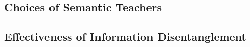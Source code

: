 \subsection{Choices of Semantic Teachers }
\label{sec:semantic_teacher}


\subsection{Effectiveness of Information Disentanglement}
\label{sec:oneshot_vc}


% 

% 


